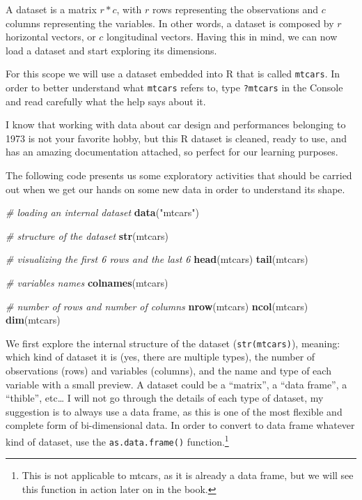 \documentclass[
]{article}
\newenvironment{Shaded}{\begin{snugshade}}{\end{snugshade}}
\newcommand{\CommentTok}[1]{\textcolor[rgb]{0.56,0.35,0.01}{\textit{#1}}}
\newcommand{\FunctionTok}[1]{\textcolor[rgb]{0.13,0.29,0.53}{\textbf{#1}}}
\newcommand{\NormalTok}[1]{#1}
\newcommand{\StringTok}[1]{\textcolor[rgb]{0.31,0.60,0.02}{#1}}
\begin{document}
A dataset is a matrix \(r*c\), with \(r\) rows representing the observations
and \(c\) columns representing the variables. In other words, a dataset is
composed by \(r\) horizontal vectors, or \(c\) longitudinal vectors. Having
this in mind, we can now load a dataset and start exploring its
dimensions.

For this scope we will use a dataset embedded into R that is called
\texttt{mtcars}. In order to better understand what \texttt{mtcars} refers to, type
\texttt{?mtcars} in the Console and read carefully what the help says about it.

I know that working with data about car design and performances
belonging to 1973 is not your favorite hobby, but this R dataset is
cleaned, ready to use, and has an amazing documentation attached, so
perfect for our learning purposes.

The following code presents us some exploratory activities that should
be carried out when we get our hands on some new data in order to
understand its shape.

\begin{Shaded}
\begin{Highlighting}[]
\CommentTok{\# loading an internal dataset}
\FunctionTok{data}\NormalTok{(}\StringTok{"mtcars"}\NormalTok{)}

\CommentTok{\# structure of the dataset}
\FunctionTok{str}\NormalTok{(mtcars)}

\CommentTok{\# visualizing the first 6 rows and the last 6}
\FunctionTok{head}\NormalTok{(mtcars)}
\FunctionTok{tail}\NormalTok{(mtcars)}

\CommentTok{\# variables names}
\FunctionTok{colnames}\NormalTok{(mtcars)}

\CommentTok{\# number of rows and number of columns}
\FunctionTok{nrow}\NormalTok{(mtcars)}
\FunctionTok{ncol}\NormalTok{(mtcars)}
\FunctionTok{dim}\NormalTok{(mtcars)}
\end{Highlighting}
\end{Shaded}

We first explore the internal structure of the dataset (\texttt{str(mtcars)}),
meaning: which kind of dataset it is (yes, there are multiple types),
the number of observations (rows) and variables (columns), and the name
and type of each variable with a small preview. A dataset could be a
``matrix'', a ``data frame'', a ``thible'', etc\ldots{} I will not go through the
details of each type of dataset, my suggestion is to always use a data
frame, as this is one of the most flexible and complete form of
bi-dimensional data. In order to convert to data frame whatever kind of
dataset, use the \texttt{as.data.frame()} function.\footnote{This is not applicable to mtcars, as it is already a data frame,
  but we will see this function in action later on in the book.}
\end{document}
